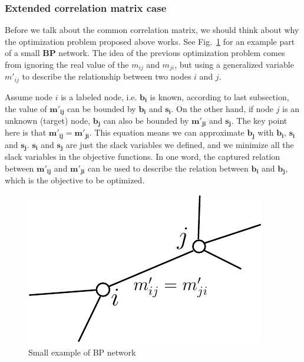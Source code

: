 \subsubsection{Extended correlation matrix case}

Before we talk about the common correlation matrix, we should think about why the optimization problem proposed above works. See Fig.~\ref{fig:bpexample} for an example part of a small \textbf{BP} network. The idea of the previous optimization problem comes from ignoring the real value of the $m_{ij}$ and $m_{ji}$, but using a generalized variable $m'_{ij}$ to describe the relationship between two nodes $i$ and $j$.

Assume node $i$ is a labeled node, i.e. $\mathbf{b_i}$ is known, according to last subsection, the value of $\mathbf{m'_{ij}}$ can be bounded by $\mathbf{b_i}$ and $\mathbf{s_i}$. On the other hand, if node $j$ is an unknown (target) node, $\mathbf{b_j}$ can also be bounded by $\mathbf{m'_{ji}}$ and $\mathbf{s_j}$. The key point here is that $\mathbf{m'_{ij}} = \mathbf{m'_{ji}}$. This equation means we can approximate $\mathbf{b_j}$ with $\mathbf{b_i}$, $\mathbf{s_i}$ and $\mathbf{s_j}$. $\mathbf{s_i}$ and $\mathbf{s_j}$ are just the slack variables we defined, and we minimize all the slack variables in the objective functions. In one word, the captured relation between $\mathbf{m'_{ij}}$ and $\mathbf{m'_{ji}}$ can be used to describe the relation between $\mathbf{b_i}$ and $\mathbf{b_{j}}$, which is the objective to be optimized.

\begin{figure}[!htb]
\begin{center}
\includegraphics[scale=0.8]{FIG/bpexample}
{\caption{Small example of BP network}\label{fig:bpexample}}
\end{center}
\end{figure}

